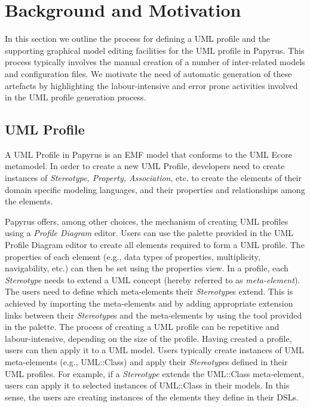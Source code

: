 \section{Background and Motivation}
\label{sec:background}

In this section we outline the process for defining a UML profile and the supporting graphical model editing facilities for the UML profile in Papyrus. 
This process typically involves the manual creation of a number of inter-related models and configuration files.
We motivate the need of automatic generation of these artefacts by highlighting the labour-intensive and error prone activities involved in the UML profile generation process.

\subsection{UML Profile}
A UML Profile in Papyrus is an EMF model that conforms to the UML Ecore metamodel. 
In order to create a new UML Profile, developers need to create instances of \textit{Stereotype, Property, Association}, etc. to create the elements of their domain specific modeling languages, and their properties and relationships among the elements.

Papyrus offers, among other choices, the mechanism of creating UML profiles using a \textit{Profile Diagram} editor. 
Users can use the palette provided in the UML Profile Diagram editor to create all elements required to form a UML profile.
The properties of each element (e.g., data types of properties, multiplicity, navigability, etc.) can then be set using the properties view. 
In a profile, each \textit{Stereotype} needs to extend a UML concept (hereby referred to as \textit{meta-element}). 
The users need to define which meta-elements their \textit{Stereotype}s extend. 
This is achieved by importing the meta-elements and by adding appropriate extension links between their \textit{Stereotype}s and the meta-elements by using the tool provided in the palette.
The process of creating a UML profile can be repetitive and labour-intensive, depending on the size of the profile.
Having created a profile, users can then apply it to a UML model. 
Users typically create instances of UML meta-elements (e.g., UML::Class) and apply their \textit{Stereotype}s defined in their UML profiles. 
For example, if a \textit{Stereotype} extends the UML::Class meta-element, users can apply it to selected instances of UML::Class in their models. 
In this sense, the users are creating instances of the elements they define in their DSLs. 

